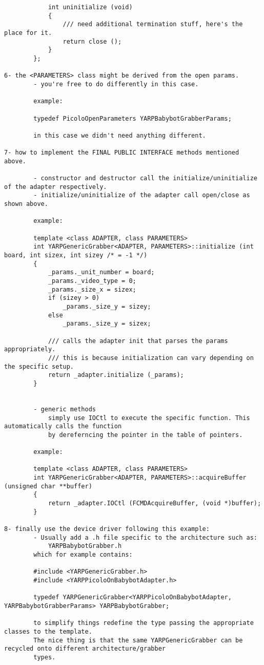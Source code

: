 \begin{verbatim}
			int uninitialize (void)
			{
				/// need additional termination stuff, here's the place for it.
				return close ();
			}
		};

6- the <PARAMETERS> class might be derived from the open params. 
		- you're free to do differently in this case.

		example:

		typedef PicoloOpenParameters YARPBabybotGrabberParams;

		in this case we didn't need anything different.

7- how to implement the FINAL PUBLIC INTERFACE methods mentioned above.

		- constructor and destructor call the initialize/uninitialize of the adapter respectively.
		- initialize/uninitialize of the adapter call open/close as shown above.

		example:

		template <class ADAPTER, class PARAMETERS>
		int YARPGenericGrabber<ADAPTER, PARAMETERS>::initialize (int board, int sizex, int sizey /* = -1 */)
		{
			_params._unit_number = board;
			_params._video_type = 0;
			_params._size_x = sizex;
			if (sizey > 0)
				_params._size_y = sizey;
			else
				_params._size_y = sizex;

			/// calls the adapter init that parses the params appropriately.
			/// this is because initialization can vary depending on the specific setup.
			return _adapter.initialize (_params);
		}


		- generic methods
			simply use IOCtl to execute the specific function. This automatically calls the function
			by dereferncing the pointer in the table of pointers.

		example:

		template <class ADAPTER, class PARAMETERS>
		int YARPGenericGrabber<ADAPTER, PARAMETERS>::acquireBuffer (unsigned char **buffer)
		{
			return _adapter.IOCtl (FCMDAcquireBuffer, (void *)buffer);
		}

8- finally use the device driver following this example:
		- Usually add a .h file specific to the architecture such as:
			YARPBabybotGrabber.h
		which for example contains:

		#include <YARPGenericGrabber.h>
		#include <YARPPicoloOnBabybotAdapter.h>

		typedef YARPGenericGrabber<YARPPicoloOnBabybotAdapter, YARPBabybotGrabberParams> YARPBabybotGrabber;

		to simplify things redefine the type passing the appropriate classes to the template.
		The nice thing is that the same YARPGenericGrabber can be recycled onto different architecture/grabber
		types.


\end{verbatim}
